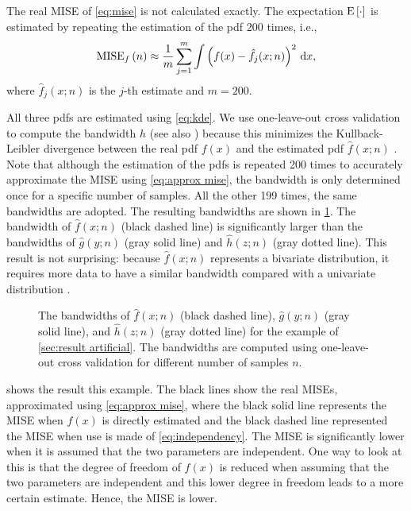 The real MISE of \cref{eq:mise} is not calculated exactly. The expectation $\textup{E} \left[ \cdot \right]$ is estimated by repeating the estimation of the pdf 200 times, i.e., 
\begin{equation}
	\label{eq:approx mise}
	\textup{MISE}_{f}\left( n \right) \approx \frac{1}{m} \sum_{j=1}^m \int \left( f(x) - \hat{f}_j(x;n)\right)^2 \mathrm{\,d} x,
\end{equation}
where $\hat{f}_j(x;n)$ is the $j$-th estimate and $m=200$. 

All three pdfs are estimated using \cref{eq:kde}. We use one-leave-out cross validation to compute the bandwidth $h$ (see also \textcite{duin1976parzen}) because this minimizes the Kullback-Leibler divergence between the real pdf $f(x)$ and the estimated pdf $\hat{f}(x;n)$ \cite{turlach1993bandwidthselection,zambom2013review}. Note that although the estimation of the pdfs is repeated 200 times to accurately approximate the MISE using \cref{eq:approx mise}, the bandwidth is only determined once for a specific number of samples. All the other 199 times, the same bandwidths are adopted. The resulting bandwidths are shown in \cref{fig:bandwidth}. The bandwidth of $\hat{f}(x;n)$ (black dashed line) is significantly larger than the bandwidths of $\hat{g}(y;n)$ (gray solid line) and $\hat{h}(z;n)$ (gray dotted line). This result is not surprising: because $\hat{f}(x;n)$ represents a bivariate distribution, it requires more data to have a similar bandwidth compared with a univariate distribution \cite{scott2005multidimensional}.

\setlength{}
\setlength{}
\begin{figure}
	\centering
	
	\caption{The bandwidths of $\hat{f}(x;n)$ (black dashed line), $\hat{g}(y;n)$ (gray solid line), and $\hat{h}(z;n)$ (gray dotted line) for the example of \cref{sec:result artificial}. The bandwidths are computed using one-leave-out cross validation for different number of samples $n$.}
	\label{fig:bandwidth}
\end{figure}

 shows the result this example. The black lines show the real MISEs, approximated using \cref{eq:approx mise}, where the black solid line represents the MISE when $f(x)$ is directly estimated and the black dashed line represented the MISE when use is made of \cref{eq:independency}. The MISE is significantly lower when it is assumed that the two parameters are independent. One way to look at this is that the degree of freedom of $f(x)$ is reduced when assuming that the two parameters are independent and this lower degree in freedom leads to a more certain estimate. Hence, the MISE is lower.

